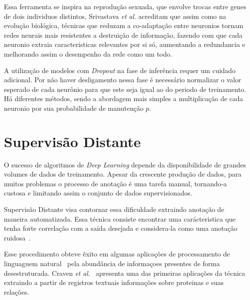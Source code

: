 Essa ferramenta se inspira na reprodução sexuada, que envolve trocas entre genes de dois individuos distintos, Srivastava \textit{et al.} acreditam que assim como na evolução biológica, técnicas que reduzam a co-adaptação entre neuronios tornam redes neurais mais resistentes a destruição de informação, fazendo com que cada neuronio extraia caracteristicas relevantes por si só, aumentando a redundancia e melhorando assim o desempenho da rede como um todo.

A utilização de modelos com \textit{Dropout} na fase de inferência requer um cuidado adicional. Por não haver desligamento nessa fase é necessário normalizar o valor esperado de cada neurônio para que este seja igual ao do periodo de treinamento. Há diferentes métodos, sendo a abordagem mais simples a multiplicação de cada neuronio por sua probabilidade de manutenção $p$.

\section{Supervisão Distante}

O sucesso de algoritmos de \textit{Deep Learning} depende da disponibilidade de grandes volumes de dados de treinamento. Apesar da crescente produção de dados, para muitos problemas o processo de anotação é uma tarefa manual, tornando-a custosa e limitando assim o conjunto de dados supervisionados.

Supervisão Distante visa contornar essa dificuldade extraindo anotação de maneira automatizada. Essa técnica consiste encontrar uma carácteristica que tenha forte correlação com a saída desejada e considera-la como uma anotação ruidosa~\cite{go09}.

Esse procedimento obteve êxito em algumas aplicações de processamento de linguaguem natural~\cite{craven99}\cite{go09} pela abundância de informaçoes presentes de forma desestruturada. Craven \textit{et al.}~\cite{craven99} apresenta uma das primeiras aplicações da técnica extraindo a partir de registros textuais informações sobre proteinas e suas relações.
